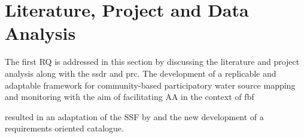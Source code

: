 \section{Literature, Project and Data Analysis}






The first RQ is addressed in this section by discussing the literature and project analysis along with the \acrshort{ssdr} and \acrshort{prc}. The development of a replicable and adaptable framework for community-based participatory water source mapping and monitoring with the aim of facilitating AA in the context of \acrlong{fbf} 


resulted in an adaptation of the \acrshort{SSF} by \autocite{fraislCitizenScienceEnvironmental2022} and the new development of a requirements oriented catalogue.

